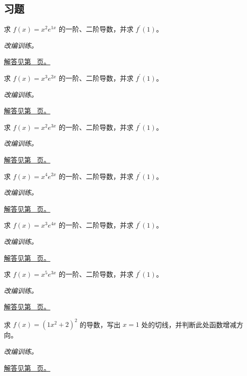 \documentclass[UTF8,12pt,a4paper,fontset=fandol]{ctexart}
\begin{document}
\subsection{习题}
\begin{example}[多项式与指数的乘积]\label{ex:c8q1}
求 $f(x)=x^{2}e^{1x}$ 的一阶、二阶导数，并求 $f^{\prime}(1)$。
\par\textit{改编训练。}\par\hyperref[ans:c8q1]{解答见第~\pageref{ans:c8q1} 页。}
\end{example}
\begin{example}[多项式与指数的乘积]\label{ex:c8q2}
求 $f(x)=x^{3}e^{2x}$ 的一阶、二阶导数，并求 $f^{\prime}(1)$。
\par\textit{改编训练。}\par\hyperref[ans:c8q2]{解答见第~\pageref{ans:c8q2} 页。}
\end{example}
\begin{example}[多项式与指数的乘积]\label{ex:c8q3}
求 $f(x)=x^{2}e^{3x}$ 的一阶、二阶导数，并求 $f^{\prime}(1)$。
\par\textit{改编训练。}\par\hyperref[ans:c8q3]{解答见第~\pageref{ans:c8q3} 页。}
\end{example}
\begin{example}[多项式与指数的乘积]\label{ex:c8q4}
求 $f(x)=x^{4}e^{2x}$ 的一阶、二阶导数，并求 $f^{\prime}(1)$。
\par\textit{改编训练。}\par\hyperref[ans:c8q4]{解答见第~\pageref{ans:c8q4} 页。}
\end{example}
\begin{example}[多项式与指数的乘积]\label{ex:c8q5}
求 $f(x)=x^{3}e^{4x}$ 的一阶、二阶导数，并求 $f^{\prime}(1)$。
\par\textit{改编训练。}\par\hyperref[ans:c8q5]{解答见第~\pageref{ans:c8q5} 页。}
\end{example}
\begin{example}[多项式与指数的乘积]\label{ex:c8q6}
求 $f(x)=x^{5}e^{3x}$ 的一阶、二阶导数，并求 $f^{\prime}(1)$。
\par\textit{改编训练。}\par\hyperref[ans:c8q6]{解答见第~\pageref{ans:c8q6} 页。}
\end{example}
\begin{example}[幂函数的链式法则]\label{ex:c8q7}
求 $f(x)=(1x^2+2)^{2}$ 的导数，写出 $x=1$ 处的切线，并判断此处函数增减方向。
\par\textit{改编训练。}\par\hyperref[ans:c8q7]{解答见第~\pageref{ans:c8q7} 页。}
\end{example}
\end{document}
